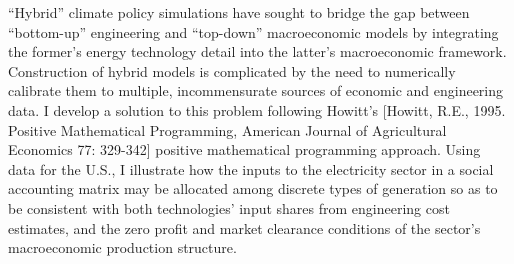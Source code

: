 “Hybrid” climate policy simulations have sought to bridge the gap between “bottom-up” engineering and “top-down” macroeconomic models by integrating the former's energy technology detail into the latter's macroeconomic framework. Construction of hybrid models is complicated by the need to numerically calibrate them to multiple, incommensurate sources of economic and engineering data. I develop a solution to this problem following Howitt's [Howitt, R.E., 1995. Positive Mathematical Programming, American Journal of Agricultural Economics 77: 329-342] positive mathematical programming approach. Using data for the U.S., I illustrate how the inputs to the electricity sector in a social accounting matrix may be allocated among discrete types of generation so as to be consistent with both technologies' input shares from engineering cost estimates, and the zero profit and market clearance conditions of the sector's macroeconomic production structure.
